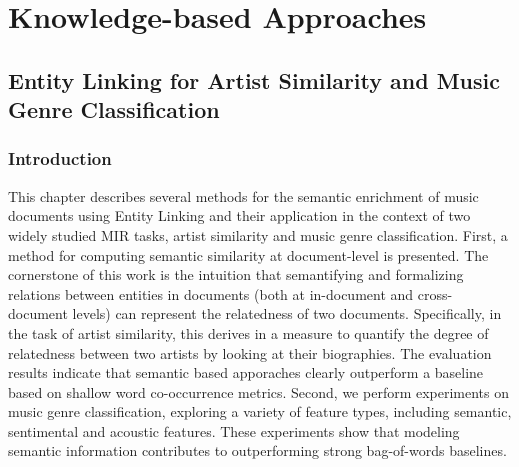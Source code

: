 
\part{Knowledge-based Approaches}
\label{part:knowledge-based}

\chapter{Entity Linking for Artist Similarity and Music Genre Classification}
\label{sec:similarity}

\section{Introduction}\label{sec:similarity:introduction} %

This chapter describes several methods for the semantic enrichment of music documents using Entity Linking and their application in the context of two widely studied MIR tasks, artist similarity and music genre classification. 
First, a method for computing semantic similarity at document-level is presented. The cornerstone of this work is the intuition that semantifying and formalizing relations between entities in documents (both at in-document and cross-document levels) can represent the relatedness of two documents. Specifically, in the task of artist similarity, this derives in a measure to quantify the degree of relatedness between two artists by looking at their biographies. The evaluation results indicate that semantic based apporaches clearly outperform a baseline based on shallow word co-occurrence metrics.
Second, we perform experiments on music genre classification, exploring a variety of feature types, including semantic, sentimental and acoustic features. These experiments show that modeling semantic information contributes to outperforming strong bag-of-words baselines. 

